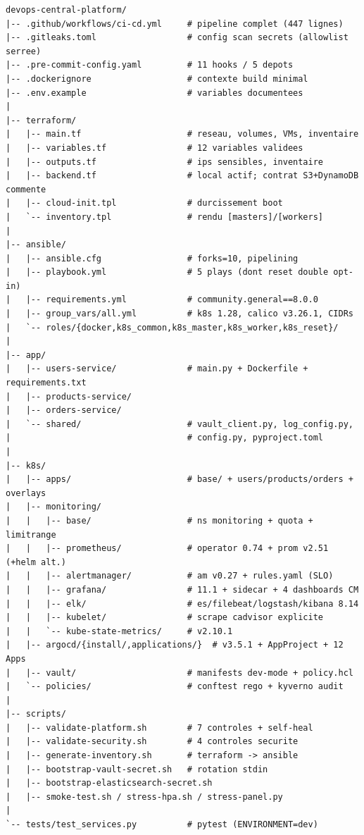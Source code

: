 \documentclass[12pt,a4paper,twoside,openright]{report}
\begin{document}
\begin{lstlisting}[caption={Structure complete du projet (fichiers cles)}]
devops-central-platform/
|-- .github/workflows/ci-cd.yml     # pipeline complet (447 lignes)
|-- .gitleaks.toml                  # config scan secrets (allowlist serree)
|-- .pre-commit-config.yaml         # 11 hooks / 5 depots
|-- .dockerignore                   # contexte build minimal
|-- .env.example                    # variables documentees
|
|-- terraform/
|   |-- main.tf                     # reseau, volumes, VMs, inventaire
|   |-- variables.tf                # 12 variables validees
|   |-- outputs.tf                  # ips sensibles, inventaire
|   |-- backend.tf                  # local actif; contrat S3+DynamoDB commente
|   |-- cloud-init.tpl              # durcissement boot
|   `-- inventory.tpl               # rendu [masters]/[workers]
|
|-- ansible/
|   |-- ansible.cfg                 # forks=10, pipelining
|   |-- playbook.yml                # 5 plays (dont reset double opt-in)
|   |-- requirements.yml            # community.general==8.0.0
|   |-- group_vars/all.yml          # k8s 1.28, calico v3.26.1, CIDRs
|   `-- roles/{docker,k8s_common,k8s_master,k8s_worker,k8s_reset}/
|
|-- app/
|   |-- users-service/              # main.py + Dockerfile + requirements.txt
|   |-- products-service/
|   |-- orders-service/
|   `-- shared/                     # vault_client.py, log_config.py,
|                                   # config.py, pyproject.toml
|
|-- k8s/
|   |-- apps/                       # base/ + users/products/orders + overlays
|   |-- monitoring/
|   |   |-- base/                   # ns monitoring + quota + limitrange
|   |   |-- prometheus/             # operator 0.74 + prom v2.51 (+helm alt.)
|   |   |-- alertmanager/           # am v0.27 + rules.yaml (SLO)
|   |   |-- grafana/                # 11.1 + sidecar + 4 dashboards CM
|   |   |-- elk/                    # es/filebeat/logstash/kibana 8.14
|   |   |-- kubelet/                # scrape cadvisor explicite
|   |   `-- kube-state-metrics/     # v2.10.1
|   |-- argocd/{install/,applications/}  # v3.5.1 + AppProject + 12 Apps
|   |-- vault/                      # manifests dev-mode + policy.hcl
|   `-- policies/                   # conftest rego + kyverno audit
|
|-- scripts/
|   |-- validate-platform.sh        # 7 controles + self-heal
|   |-- validate-security.sh        # 4 controles securite
|   |-- generate-inventory.sh       # terraform -> ansible
|   |-- bootstrap-vault-secret.sh   # rotation stdin
|   |-- bootstrap-elasticsearch-secret.sh
|   |-- smoke-test.sh / stress-hpa.sh / stress-panel.py
|
`-- tests/test_services.py          # pytest (ENVIRONMENT=dev)
\end{lstlisting}
\end{document}
